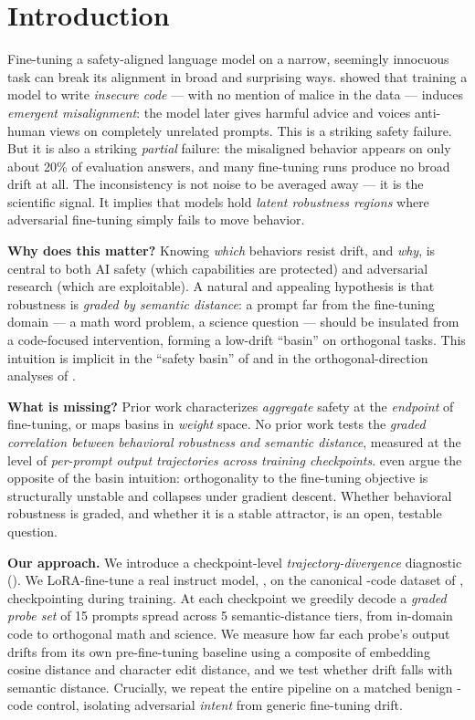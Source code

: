 \section{Introduction}
\label{sec:intro}

Fine-tuning a safety-aligned language model on a narrow, seemingly innocuous task can
break its alignment in broad and surprising ways. \citet{betley2025em} showed that
training a model to write \emph{insecure code} --- with no mention of malice in the data ---
induces \emph{emergent misalignment}: the model later gives harmful advice and voices
anti-human views on completely unrelated prompts. This is a striking safety failure. But it
is also a striking \emph{partial} failure: the misaligned behavior appears on only about
20\% of evaluation answers, and many fine-tuning runs produce no broad drift at all. The
inconsistency is not noise to be averaged away --- it is the scientific signal. It implies
that models hold \emph{latent robustness regions} where adversarial fine-tuning simply fails
to move behavior.

{\bf Why does this matter?} Knowing \emph{which} behaviors resist drift, and \emph{why},
is central to both AI safety (which capabilities are protected) and adversarial research
(which are exploitable). A natural and appealing hypothesis is that robustness is
\emph{graded by semantic distance}: a prompt far from the fine-tuning domain --- a math word
problem, a science question --- should be insulated from a code-focused intervention,
forming a low-drift ``basin'' on orthogonal tasks. This intuition is implicit in the
``safety basin'' of \citet{peng2024landscape} and in the orthogonal-direction analyses of
\citet{yang2025asft}.

{\bf What is missing?} Prior work characterizes \emph{aggregate} safety at the
\emph{endpoint} of fine-tuning, or maps basins in \emph{weight} space. No prior work tests
the \emph{graded correlation between behavioral robustness and semantic distance}, measured
at the level of \emph{per-prompt output trajectories across training checkpoints}.
\citet{springer2026geometry} even argue the opposite of the basin intuition: orthogonality
to the fine-tuning objective is structurally unstable and collapses under gradient descent.
Whether behavioral robustness is graded, and whether it is a stable attractor, is an open,
testable question.

{\bf Our approach.} We introduce a checkpoint-level \emph{trajectory-divergence} diagnostic
(\method). We LoRA-fine-tune a real instruct model, \smol, on the canonical \insecure-code
dataset of \citet{betley2025em}, checkpointing during training. At each checkpoint we greedily
decode a \emph{graded probe set} of 15 prompts spread across 5 semantic-distance tiers, from
in-domain code to orthogonal math and science. We measure how far each probe's output drifts
from its own pre-fine-tuning baseline using a composite of embedding cosine distance and
character edit distance, and we test whether drift falls with semantic distance. Crucially,
we repeat the entire pipeline on a matched benign \secure-code control, isolating
adversarial \emph{intent} from generic fine-tuning drift.

